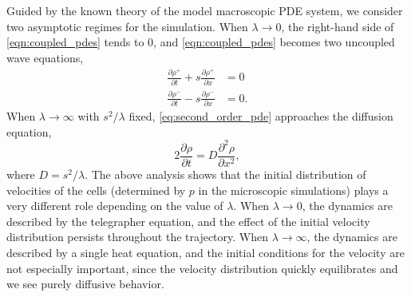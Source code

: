\documentclass[3p]{elsarticle}
\begin{document}
Guided by the known theory of the model macroscopic PDE system, we consider two asymptotic regimes for the simulation.
%
When $\lambda \rightarrow 0$, the right-hand side of \eqref{eqn:coupled_pdes} tends to 0, and \eqref{eqn:coupled_pdes} becomes two uncoupled wave equations,
\begin{equation}
\begin{aligned}
\frac{\partial \rho^+}{\partial t} + s \frac{\partial \rho^+}{\partial x} & = 0 \\
\frac{\partial \rho^-}{\partial t} - s \frac{\partial \rho^-}{\partial x} & = 0.
\end{aligned}
\end{equation}
%
When $\lambda \rightarrow \infty$ with $s^2/\lambda$ fixed, \eqref{eq:second_order_pde} approaches the diffusion equation,
\begin{equation} \label{eq:diff_eqn}
2 \frac{\partial \rho}{\partial t} = D \frac{\partial ^2 \rho}{\partial x^2},
\end{equation}
%
where $D=s^2/\lambda$.
%
The above analysis shows that the initial distribution of velocities of the cells 
(determined by $p$ in the microscopic simulations) plays a very different role depending on the value of $\lambda$.
%
When $\lambda \rightarrow 0$, the dynamics are described by the telegrapher equation, and the effect of the initial velocity distribution 
persists throughout the trajectory.
%
When $\lambda \rightarrow \infty$, the dynamics are described by a single heat equation, and the initial conditions 
for the velocity are not especially important, since the velocity distribution quickly equilibrates and we see purely diffusive behavior.
\end{document}
